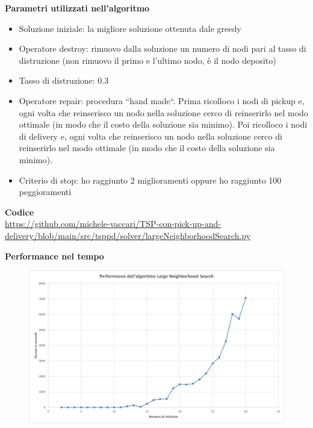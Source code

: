 \documentclass[9pt]{beamer}
\begin{document}
\begin{frame}{\subsecname}
	\textbf{Parametri utilizzati nell'algoritmo}
	\begin{itemize}
		\item
		Soluzione iniziale: la migliore soluzione ottenuta dale greedy
		\item
		Operatore destroy: rimuovo dalla soluzione un numero di nodi pari al tasso di distruzione (non rimuovo il primo e l’ultimo nodo, è il nodo deposito)
		\item
		Tasso di distruzione: 0.3
		\item
		Operatore repair: procedura ``hand made``. Prima ricolloco i nodi di pickup e, ogni volta che reinserisco un nodo nella soluzione cerco di reinserirlo nel modo ottimale (in modo che il costo della soluzione sia minimo). Poi ricolloco i nodi di delivery e, ogni volta che reinserisco un nodo nella soluzione cerco di reinserirlo nel modo ottimale (in modo che il costo della soluzione sia minimo).
		\item
		Criterio di stop: ho raggiunto 2 miglioramenti oppure ho raggiunto 100 peggioramenti
	\end{itemize}

	\textbf{Codice} \\
	\href{https://github.com/michele-vaccari/TSP-con-pick-up-and-delivery/blob/main/src/tsppd/solver/largeNeighborhoodSearch.py}{https://github.com/michele-vaccari/TSP-con-pick-up-and-delivery/blob/main/src/tsppd/solver/largeNeighborhoodSearch.py}

\framebreak

	\textbf{Performance nel tempo}
      	\begin{figure}[h]
	\centering
	\includegraphics[width=\textwidth]
	{../charts/13 Performance dell'algoritmo Large Neighborhood Search}
	\end{figure}

\end{frame}
\end{document}
